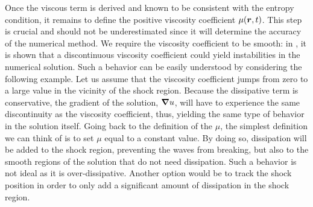Once the viscous term is derived and known to be consistent with the entropy condition, it remains to define the positive viscosity coefficient $\mu(\boldsymbol r,t)$. This step is crucial and should not be underestimated since it will determine the accuracy of the numerical method. We require the viscosity coefficient to be smooth: in \cite{Barter},  it is shown that a discontinuous viscosity coefficient could yield instabilities in the numerical solution. Such a behavior can be easily understood by considering the following example. Let us assume that the viscosity coefficient jumps from zero to a large value in the vicinity of the shock region. Because the dissipative term is conservative, the gradient of the solution, $\boldsymbol{\nabla} u$, will have to experience the same discontinuity as the viscosity coefficient, thus, yielding the same type of behavior in the solution itself. Going back to the definition of the $\mu$, the simplest definition we can think of is to set $\mu$ equal to a constant value. By doing so, dissipation will be added to the shock region, preventing the waves from breaking, but also to the smooth regions of the solution that do not need dissipation. Such a behavior is not ideal as it is over-dissipative. Another option would be to track the shock position in order to only add a significant amount of dissipation in the shock region.    
